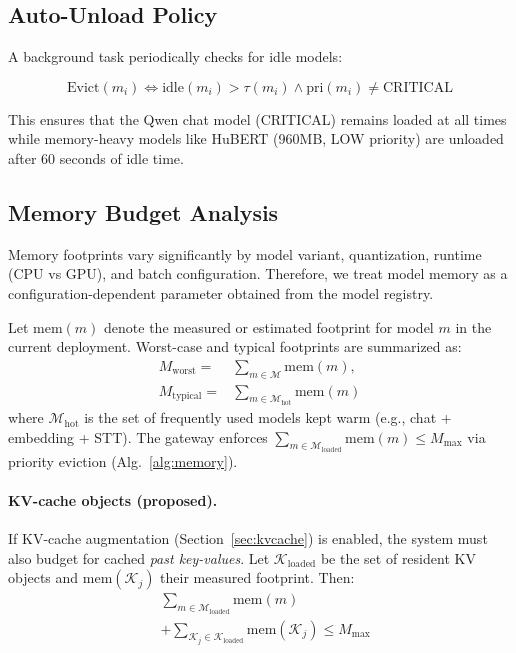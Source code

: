 \documentclass[11pt,a4paper,twocolumn]{article}
\begin{document}
\subsection{Auto-Unload Policy}

A background task periodically checks for idle models:

\begin{equation}
\text{Evict}(m_i) \iff \text{idle}(m_i) > \tau(m_i) \wedge \text{pri}(m_i) \neq \text{CRITICAL}
\end{equation}

This ensures that the Qwen chat model (CRITICAL) remains loaded at all times while memory-heavy models like HuBERT (960MB, LOW priority) are unloaded after 60 seconds of idle time.

\subsection{Memory Budget Analysis}

Memory footprints vary significantly by model variant, quantization, runtime (CPU vs GPU), and batch configuration. Therefore, we treat model memory as a configuration-dependent parameter obtained from the model registry.

Let $\text{mem}(m)$ denote the measured or estimated footprint for model $m$ in the current deployment. Worst-case and typical footprints are summarized as:
\begin{equation}
\begin{aligned}
M_{\text{worst}} ={}& \sum_{m \in \mathcal{M}} \text{mem}(m), \\
M_{\text{typical}} ={}& \sum_{m \in \mathcal{M}_{\text{hot}}} \text{mem}(m)
\end{aligned}
\end{equation}
where $\mathcal{M}_{\text{hot}}$ is the set of frequently used models kept warm (e.g., chat + embedding + STT). The gateway enforces $\sum_{m \in \mathcal{M}_{\text{loaded}}} \text{mem}(m) \le M_{\max}$ via priority eviction (Alg.~\ref{alg:memory}).

\paragraph{KV-cache objects (proposed).} If KV-cache augmentation (Section~\ref{sec:kvcache}) is enabled, the system must also budget for cached \emph{past key-values}. Let $\mathcal{K}_{\text{loaded}}$ be the set of resident KV objects and $\text{mem}(\mathcal{K}_j)$ their measured footprint. Then:
\begin{equation}
\begin{aligned}
& \sum_{m \in \mathcal{M}_{\text{loaded}}} \text{mem}(m) \\
& + \sum_{\mathcal{K}_j \in \mathcal{K}_{\text{loaded}}} \text{mem}(\mathcal{K}_j) \le M_{\max}
\end{aligned}
\end{equation}
\end{document}
